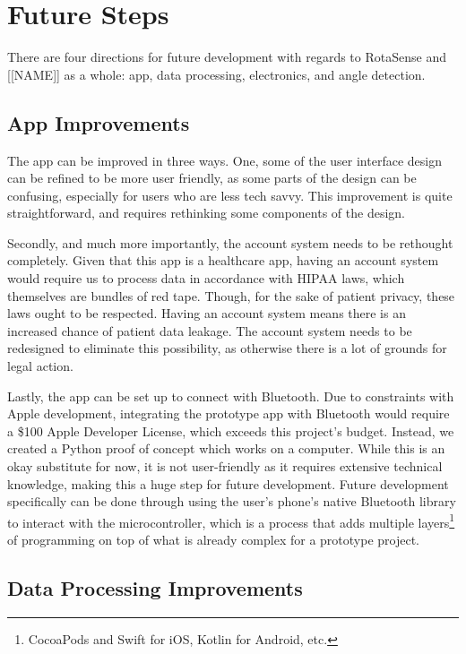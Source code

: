 \chapter{Future Steps}
\label{chap:future}

There are four directions for future development with regards to RotaSense and
[[NAME]] as a whole: app, data processing, electronics, and angle detection.

\section{App Improvements}

The app can be improved in three ways. One, some of the user interface
design can be refined to be more user friendly, as some parts of the design can
be confusing, especially for users who are less tech savvy. This improvement is
quite straightforward, and requires rethinking some components of the design. 

Secondly, and much more importantly, the account system needs to be rethought
completely. Given that this app is a healthcare app, having an account system
would require us to process data in accordance with HIPAA laws, which
themselves are bundles of red tape. Though, for the sake of patient privacy,
these laws ought to be respected. Having an account system means there is an
increased chance of patient data leakage. The account system needs to be
redesigned to eliminate this possibility, as otherwise there is a lot of
grounds for legal action. 

Lastly, the app can be set up to connect with Bluetooth. Due to constraints
with Apple development, integrating the prototype app with Bluetooth would
require a \$100 Apple Developer License, which exceeds this project’s
budget. Instead, we created a Python proof of concept which works on a
computer. While this is an okay substitute for now, it is not user-friendly as
it requires extensive technical knowledge, making this a huge step for future
development. Future development specifically can be done through using the
user’s phone’s native Bluetooth library to interact with the microcontroller,
which is a process that adds multiple
layers\footnote{CocoaPods and Swift for iOS, Kotlin for Android, etc.}
of programming on top of what is already complex for a prototype project.

\section{Data Processing Improvements}

